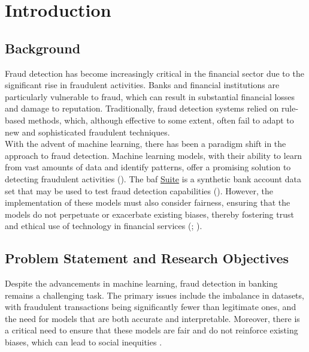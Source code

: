 \documentclass[12pt,a4paper]{report}
\begin{document}
\printglossary[type=\acronymtype, title=Abbreviations]

\clearpage

\tableofcontents



\clearpage


\chapter{Introduction}


\section{Background}
Fraud detection has become increasingly critical in the financial sector due to the significant rise in fraudulent activities. Banks and financial institutions are particularly vulnerable to fraud, which can result in substantial financial losses and damage to reputation. Traditionally, fraud detection systems relied on rule-based methods, which, although effective to some extent, often fail to adapt to new and sophisticated fraudulent techniques.\\


With the advent of machine learning, there has been a paradigm shift in the approach to fraud detection. Machine learning models, with their ability to learn from vast amounts of data and identify patterns, offer a promising solution to detecting fraudulent activities (\citealp[p.4]{bao2020detecting}). The \acrshort{baf} \href{https://www.kaggle.com/datasets/sgpjesus/bank-account-fraud-dataset-neurips-2022/code}{Suite} is a synthetic bank account data set that may be used to test fraud detection capabilities (\citealp{jesus2022turning}). However, the implementation of these models must also consider fairness, ensuring that the models do not perpetuate or exacerbate existing biases, thereby fostering trust and ethical use of technology in financial services (\citealp[p.114]{barocas2023fairness}; \citealp[p.12]{mehrabi2021survey}).\\





\section{Problem Statement and Research Objectives}
Despite the advancements in machine learning, fraud detection in banking remains a challenging task. The primary issues include the imbalance in datasets, with fraudulent transactions being significantly fewer than legitimate ones, and the need for models that are both accurate and interpretable. Moreover, there is a critical need to ensure that these models are fair and do not reinforce existing biases, which can lead to social inequities \citep{corbett2023measure}.\\
\end{document}
